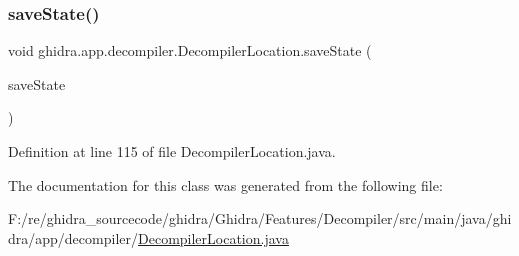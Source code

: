 \subsubsection{\texorpdfstring{saveState()}{saveState()}}
{\footnotesize\ttfamily void ghidra.\+app.\+decompiler.\+Decompiler\+Location.\+save\+State (\begin{DoxyParamCaption}\item[{Save\+State}]{save\+State }\end{DoxyParamCaption})\hspace{0.3cm}{\ttfamily [inline]}}



Definition at line 115 of file Decompiler\+Location.\+java.



The documentation for this class was generated from the following file\+:\begin{DoxyCompactItemize}
\item 
F\+:/re/ghidra\+\_\+sourcecode/ghidra/\+Ghidra/\+Features/\+Decompiler/src/main/java/ghidra/app/decompiler/\mbox{\hyperlink{_decompiler_location_8java}{Decompiler\+Location.\+java}}\end{DoxyCompactItemize}
